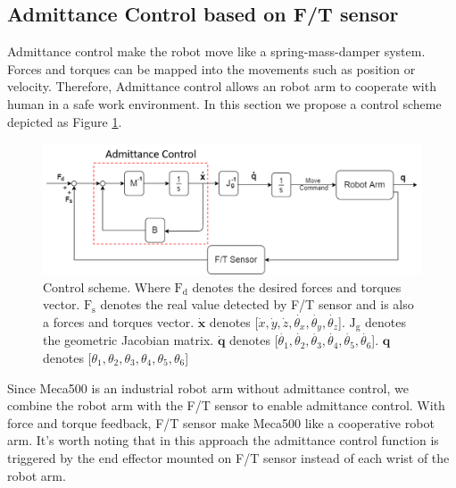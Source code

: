 \subsection{Admittance Control based on F/T sensor}
\label{sec:adm ctrl}
Admittance control make the robot move like a spring-mass-damper system. Forces and torques can be mapped into the movements such as position or velocity. Therefore, Admittance control allows an robot arm to cooperate with human in a safe work environment. In this section we propose a control scheme depicted as Figure \ref{fig:adm ctrl}.
\begin{figure}[htbp]
\begin{center}
\includegraphics[width=1\linewidth]{Images/adm ctrl.png}
\end{center}
\caption{
Control scheme. Where $\text{F}_{\text{d}}$ denotes the desired forces and torques vector. $\text{F}_{\text{s}}$ denotes the real value detected by F/T sensor and is also a forces and torques vector. $\dot{\textbf{x}}$ denotes [$\dot{x}, \dot{y}, \dot{z}, \dot{\theta _x}, \dot{\theta _y}, \dot{\theta _z}$]. $\text{J}_{\text{g}}$ denotes the geometric Jacobian matrix. $\dot{\textbf{q}}$ denotes [$\dot{\theta _1}, \dot{\theta _2}, \dot{\theta _3}, \dot{\theta _4}, \dot{\theta _5}, \dot{\theta _6}$]. $\textbf{q}$ denotes [$\theta _1, \theta _2, \theta _3, \theta _4, \theta _5, \theta _6 $]
}\label{fig:adm ctrl}
\end{figure} 
Since Meca500 is an industrial robot arm without admittance control, we combine the robot arm with the F/T sensor to enable admittance control. With force and torque feedback, F/T sensor make Meca500 like a cooperative robot arm. It's worth noting that in this approach the admittance control function is triggered by the end effector mounted on F/T sensor instead of each wrist of the robot arm.\\
